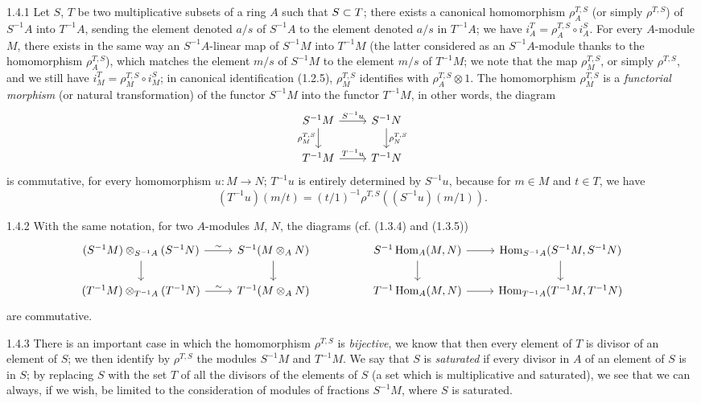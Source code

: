 \documentclass[../main.tex]{subfiles}
\begin{document}
\begin{cx}{1.4.1}
Let $S$, $T$ be two multiplicative subsets of a ring $A$ such that $S\subset T$; there exists a canonical
homomorphism $\rho_A^{T,S}$ (or simply $\rho^{T,S}$) of $S^{-1}A$ into  $T^{-1}A$, sending the
element denoted $a/s$ of $S^{-1}A$ to the element denoted $a/s$ in $T^{-1}A$; we have
${i_A^T=\rho_A^{T,S}\circ i_A^S}$. For every $A$-module $M$, there exists in the same way an
$S^{-1}A$-linear map of $S^{-1}M$ into $T^{-1}M$ (the latter considered as an $S^{-1}A$-module thanks
to the homomorphism $\rho_A^{T,S}$), which matches the element $m/s$ of $S^{-1}M$ to the element $m/s$
of $T^{-1}M$; we note that the map $\rho_M^{T,S}$, or simply $\rho^{T,S}$, and we still have
$i_M^T=\rho_M^{T,S}\circ i_M^S$; in canonical identification (1.2.5), $\rho_M^{T,S}$ identifies with
$\rho_A^{T,S}\otimes 1$. The homomorphism $\rho_M^{T,S}$ is a \emph{functorial morphism} (or natural
transformation) of the functor $S^{-1}M$ into the functor $T^{-1}M$, in other words, the diagram
\[\TI
  S^{-1}M\ar[r,"S^{-1}u"]\ar[d,"\rho_M^{T,S}"'] & S^{-1}N\ar[d,"\rho_N^{T,S}"]\\
  T^{-1}M\ar[r,"T^{-1}u"] & T^{-1}N
\TE\]
is commutative, for every homomorphism $u:M\to N$; $T^{-1}u$ is entirely determined by
$S^{-1}u$, because for $m\in M$ and $t\in T$, we have
\[
  (T^{-1}u)(m/t)=(t/1)^{-1}\rho^{T,S}((S^{-1}u)(m/1)).
\]
\end{cx}

\begin{cx}{1.4.2}
With the same notation, for two $A$-modules $M$, $N$, the diagrams (cf. (1.3.4) and (1.3.5))
\[\TI
  (S^{-1}M)\otimes_{S^{-1}A}(S^{-1}N)\ar[r,"\sim"]\ar[d] & S^{-1}(M\otimes_A N)\ar[d] & &
  S^{-1}\Hom_A(M,N)\ar[r]\ar[d] &\Hom_{S^{-1}A}(S^{-1}M,S^{-1}N)\ar[d]\\
  (T^{-1}M)\otimes_{T^{-1}A}(T^{-1}N)\ar[r,"\sim"] & T^{-1}(M\otimes_A N) & &
  T^{-1}\Hom_A(M,N)\ar[r] &\Hom_{T^{-1}A}(T^{-1}M,T^{-1}N)
\TE\]
are commutative.
\end{cx}

\begin{cx}{1.4.3}
There is an important case in which the homomorphism $\rho^{T,S}$ is \emph{bijective},
we know that then every element of $T$ is divisor of an element of $S$; we then identify by
$\rho^{T,S}$ the modules $S^{-1}M$ and $T^{-1}M$. We say that $S$ is \emph{saturated} if every divisor
in $A$ of an element of $S$ is in $S$; by replacing $S$ with  the set $T$ of all the divisors of the
elements of $S$ (a set which is multiplicative and saturated), we see that we can always, if we wish,
be limited to the consideration of modules of fractions $S^{-1}M$, where $S$ is saturated.
\end{cx}
\end{document}
